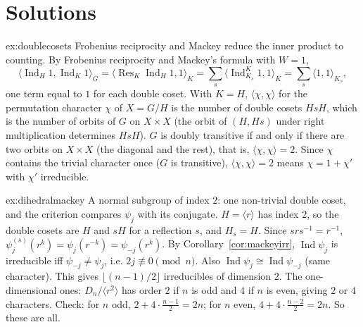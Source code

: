 \section{Solutions}

\begin{solution}{ex:doublecosets}
\idea Frobenius reciprocity and Mackey reduce the inner product to counting.
\writeup By Frobenius reciprocity and Mackey's formula with $W=1$,
\[
\langle\operatorname{Ind}_H1,\operatorname{Ind}_K1\rangle_G=\langle\operatorname{Res}_K\operatorname{Ind}_H1,1\rangle_K=\sum_s\langle\operatorname{Ind}_{K_s}^K1,1\rangle_K=\sum_s\langle1,1\rangle_{K_s},
\]
one term equal to $1$ for each double coset. With $K=H$, $\langle\chi,\chi\rangle$ for the permutation character $\chi$ of $X=G/H$ is the number of double cosets $HsH$, which is the number of orbits of $G$ on $X\times X$ (the orbit of $(H,Hs)$ under
right multiplication determines $HsH$). $G$ is doubly transitive if and only if there are two orbits on $X\times X$ (the diagonal and the rest), that is, $\langle\chi,\chi\rangle=2$. Since $\chi$ contains the trivial character once
($G$ is transitive), $\langle\chi,\chi\rangle=2$ means $\chi=1+\chi'$ with $\chi'$ irreducible.
\end{solution}

\begin{solution}{ex:dihedralmackey}
\idea A normal subgroup of index $2$: one non-trivial double coset, and the criterion compares $\psi_j$ with its conjugate.
\writeup $H=\langle r\rangle$ has index $2$, so the double cosets are $H$ and $sH$ for a reflection $s$, and $H_s=H$. Since $srs^{-1}=r^{-1}$, $\psi_j^{(s)}(r^k)=\psi_j(r^{-k})=\psi_{-j}(r^k)$. By Corollary~\ref{cor:mackeyirr}, $\operatorname{Ind}\psi_j$ is
irreducible iff $\psi_{-j}\ne\psi_j$, i.e. $2j\not\equiv0\pmod n$. Also $\operatorname{Ind}\psi_j\cong\operatorname{Ind}\psi_{-j}$ (same character). This gives $\lfloor(n-1)/2\rfloor$ irreducibles of dimension $2$. The one-dimensional
ones: $D_n/\langle r^2\rangle$ has order $2$ if $n$ is odd and $4$ if $n$ is even, giving $2$ or $4$ characters. Check: for $n$ odd, $2+4\cdot\frac{n-1}2=2n$; for $n$ even, $4+4\cdot\frac{n-2}2=2n$. So these are all.
\end{solution}

